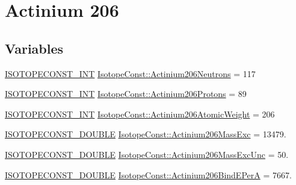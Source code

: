 \hypertarget{group___isotope_const-_actinium-_ac206}{}\section{Actinium 206}
\label{group___isotope_const-_actinium-_ac206}
\subsection*{Variables}
\begin{DoxyCompactItemize}
\item 
\mbox{\hyperlink{group___isotope_const-_macros_ga5f18360b3e99483a35c32d789e62621c}{I\+S\+O\+T\+O\+P\+E\+C\+O\+N\+S\+T\+\_\+\+I\+NT}} \mbox{\hyperlink{group___isotope_const-_actinium-_ac206_ga9f2a725294a8c5a71b5d64b554532da0}{Isotope\+Const\+::\+Actinium206\+Neutrons}} = 117
\item 
\mbox{\hyperlink{group___isotope_const-_macros_ga5f18360b3e99483a35c32d789e62621c}{I\+S\+O\+T\+O\+P\+E\+C\+O\+N\+S\+T\+\_\+\+I\+NT}} \mbox{\hyperlink{group___isotope_const-_actinium-_ac206_ga870afa82e5b00645b1452feef7a68166}{Isotope\+Const\+::\+Actinium206\+Protons}} = 89
\item 
\mbox{\hyperlink{group___isotope_const-_macros_ga5f18360b3e99483a35c32d789e62621c}{I\+S\+O\+T\+O\+P\+E\+C\+O\+N\+S\+T\+\_\+\+I\+NT}} \mbox{\hyperlink{group___isotope_const-_actinium-_ac206_ga4e7ed9398536487d028202b60fc72996}{Isotope\+Const\+::\+Actinium206\+Atomic\+Weight}} = 206
\item 
\mbox{\hyperlink{group___isotope_const-_macros_ga8f45a7272ce02c0b4c65c44636ed719a}{I\+S\+O\+T\+O\+P\+E\+C\+O\+N\+S\+T\+\_\+\+D\+O\+U\+B\+LE}} \mbox{\hyperlink{group___isotope_const-_actinium-_ac206_gaa58d395495db8243baaaaba35ad0132d}{Isotope\+Const\+::\+Actinium206\+Mass\+Exc}} = 13479.
\item 
\mbox{\hyperlink{group___isotope_const-_macros_ga8f45a7272ce02c0b4c65c44636ed719a}{I\+S\+O\+T\+O\+P\+E\+C\+O\+N\+S\+T\+\_\+\+D\+O\+U\+B\+LE}} \mbox{\hyperlink{group___isotope_const-_actinium-_ac206_ga499d29d74c70734d34299cae81883048}{Isotope\+Const\+::\+Actinium206\+Mass\+Exc\+Unc}} = 50.
\item 
\mbox{\hyperlink{group___isotope_const-_macros_ga8f45a7272ce02c0b4c65c44636ed719a}{I\+S\+O\+T\+O\+P\+E\+C\+O\+N\+S\+T\+\_\+\+D\+O\+U\+B\+LE}} \mbox{\hyperlink{group___isotope_const-_actinium-_ac206_ga70c984ba3c6f079f92b5f893f0701817}{Isotope\+Const\+::\+Actinium206\+Bind\+E\+PerA}} = 7667.
\item 

\end{DoxyCompactItemize}
